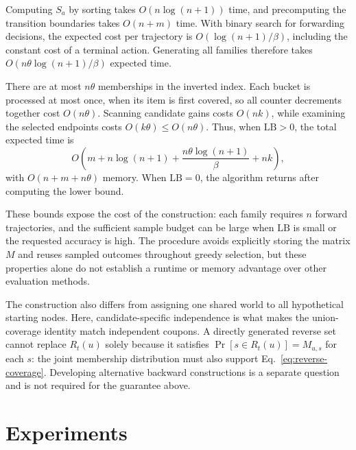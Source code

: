 \documentclass[sigconf]{acmart}
\begin{document}
Computing $S_a$ by sorting takes $O(n\log(n+1))$ time, and
precomputing the transition boundaries takes $O(n+m)$ time.
With binary search for forwarding decisions, the expected cost
per trajectory is $O(\log(n+1)/\beta)$, including the constant
cost of a terminal action. Generating all families therefore
takes $O(n\theta\log(n+1)/\beta)$ expected time.

There are at most $n\theta$ memberships in the inverted index.
Each bucket is processed at most once, when its item is first
covered, so all counter decrements together cost $O(n\theta)$.
Scanning candidate gains costs $O(nk)$, while examining the
selected endpoints costs $O(k\theta)\le O(n\theta)$.
Thus, when $\mathrm{LB}>0$, the total expected time is
\begin{equation}
\label{eq:total-complexity}
 O\left(m+n\log(n+1)+\frac{n\theta\log(n+1)}{\beta}+nk\right),
\end{equation}
with $O(n+m+n\theta)$ memory. When $\mathrm{LB}=0$, the algorithm
returns after computing the lower bound.

These bounds expose the cost of the construction: each family
requires $n$ forward trajectories, and the sufficient sample
budget can be large when $\mathrm{LB}$ is small or the requested
accuracy is high. The procedure avoids explicitly storing the
matrix $M$ and reuses sampled outcomes throughout greedy selection,
but these properties alone do not establish a runtime or memory
advantage over other evaluation methods.

The construction also differs from assigning one shared world
to all hypothetical starting nodes. Here, candidate-specific
independence is what makes the union-coverage identity match
independent coupons. A directly generated reverse set cannot
replace $R_t(u)$ solely because it satisfies
$\Pr[s\in R_t(u)]=M_{u,s}$ for each $s$: the joint membership
distribution must also support Eq.~\eqref{eq:reverse-coverage}.
Developing alternative backward constructions is a separate
question and is not required for the guarantee above.


\section{Experiments}
\label{sec:exp}


\end{document}
